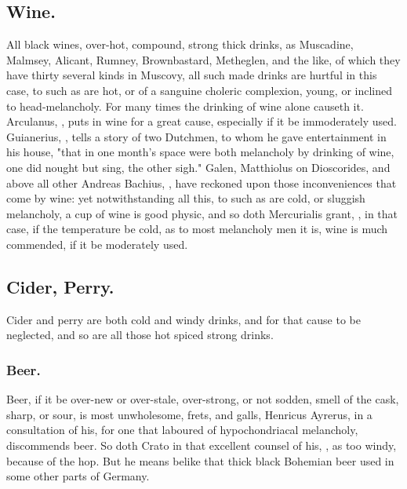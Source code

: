 \subsection{Wine.}

All black wines, over-hot, compound, strong thick drinks, as Muscadine,
Malmsey, Alicant, Rumney, Brownbastard, Metheglen, and the like, of which they
have thirty several kinds in Muscovy, all such made drinks are hurtful in this
case, to such as are hot, or of a sanguine choleric complexion, young, or
inclined to head-melancholy. For many times the drinking of wine alone causeth
it. Arculanus, , puts in
wine for a great cause, especially if it be immoderately
used. Guianerius, , tells a story of two
Dutchmen, to whom he gave entertainment in his house, "that
in one month's space were both melancholy by drinking of
wine, one did nought but sing, the other sigh." Galen,  Matthiolus on Dioscorides, and above all other Andreas
Bachius, , have reckoned upon those
inconveniences that come by wine: yet notwithstanding all this, to such as are
cold, or sluggish melancholy, a cup of wine is good physic, and so doth
Mercurialis grant, , in that case, if the
temperature be cold, as to most melancholy men it is, wine is much commended,
if it be moderately used.

\subsection{Cider, Perry.}

Cider and perry are both cold and windy drinks, and for that cause to be
neglected, and so are all those hot spiced strong drinks.

\subsubsection{Beer.}

Beer, if it be over-new or over-stale, over-strong, or not sodden, smell of the
cask, sharp, or sour, is most unwholesome, frets, and galls, \etc{} Henricus
Ayrerus, in a consultation of his, for one that laboured
of hypochondriacal melancholy, discommends beer. So doth
Crato in that excellent counsel of his,
, as too windy, because of the hop.
But he means belike that thick black Bohemian beer used in some other parts of
Germany.

